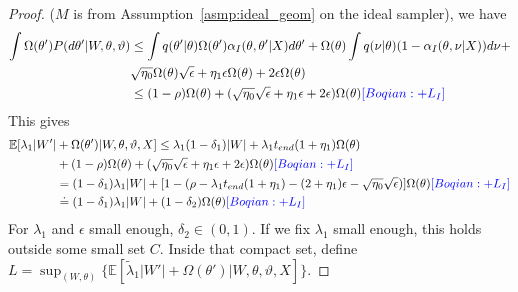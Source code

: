 \begin{proof}
($M$ is from Assumption~\ref{asmp:ideal_geom} on 
the ideal sampler), we have 
\begin{align*}
  \int \Omega(\theta') P(d\theta'| W, \theta, \vartheta)
  & \leq \int q(\theta' | \theta) \Omega(\theta')\alpha_I(\theta, \theta'| X) d\theta'  + \Omega(\theta)\int  q(\nu | \theta) (1 - \alpha_I(\theta, \nu | X)) d\nu+ \\
  &\sqrt{\eta_0}\Omega(\theta) \sqrt{\epsilon} +  \eta_1 \epsilon \Omega(\theta) + 2\epsilon \Omega(\theta)\\
  & \leq (1 - \rho) \Omega(\theta) + (\sqrt{\eta_0} \sqrt{\epsilon} +  \eta_1 \epsilon + 2\epsilon) \Omega(\theta) \textcolor{blue}{[Boqian: + L_I]}
\end{align*}
This gives
\begin{align*}
\mathbb{E}[\lambda_1 | W'| &+ \Omega(\theta')| W, \theta, \vartheta, X] \le \lambda_1(1 - \delta_1)|W| + \lambda_1 t_{end} (1 + \eta_1)\Omega(\theta)\\
&+  (1 - \rho) \Omega(\theta) + (\sqrt{\eta_0} \sqrt{\epsilon} +  \eta_1 \epsilon + 2\epsilon) \Omega(\theta) \textcolor{blue}{[Boqian: + L_I]}\\
& = (1 - \delta_1)\lambda_1 |W| + [1 - (\rho - \lambda_1 t_{end} (1 + \eta_1) - (2 + \eta_1)\epsilon - \sqrt{\eta_0} \sqrt{\epsilon})]\Omega(\theta) \textcolor{blue}{[Boqian: + L_I]}\\
& \doteq (1 - \delta_1)\lambda_1 |W| + (1 - \delta_2)\Omega(\theta) \textcolor{blue}{[Boqian: + L_I]}
\end{align*}
For $\lambda_1$ and $\epsilon$ small enough, $\delta_2 \in (0,1)$. If we 
fix $\lambda_1$ small enough, this holds outside some small set $C$.
Inside that compact set, define 
$L = \sup_{(W, \theta)} \{ \mathbb{E}[\tilde{\lambda}_1 | W'| + 
      \Omega(\theta')| W, \theta, \vartheta, X] \}$.

\end{proof}
